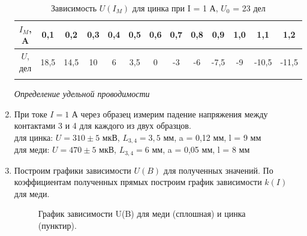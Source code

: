 \documentclass[a4paper, 12pt]{article}%
\begin{document}
\begin{enumerate}
	\begin{longtable} {|c|c|c|c|c|c|c|c|c|c|c|c|c|}
		\hline
		$I_M$, A & 0,1 & 0,2 & 0,3 & 0,4 & 0,5 & 0,6 & 0,7 & 0,8 & 0,9 & 1,0 & 1,1 & 1,2  \\ \hline
		$U$, дел & 18,5 & 14,5 & 10 & 6 & 3,5 & 0 & -3 & -6 & -7,5 & -9 & -10,5 & -11,5 \\ \hline
		\caption{Зависимость $U(I_M)$ для цинка при I = 1 А, $U_0$ = 23 дел}
	\end{longtable}
		
	
	\newpage
	\textit{Определение удельной проводимости}\\
	
	\item При токе $I = 1 $ А через образец измерим падение напряжения между контактами 3 и 4 для каждого из двух образцов.\\
	для цинка: $U = 310 \pm 5$ мкВ, $L_{3,4} = 3,5$ мм, a = 0,12 мм, l = 9 мм\\
	для меди: $U = 470 \pm 5$ мкВ, $L_{3,4} = 6$ мм, a = 0,05 мм, l = 8 мм\\
	
	\item Построим графики зависимости $U(B)$ для полученных значений. По коэффициентам полученных прямых построим график зависимости $k(I)$ для меди.
	
	
	\begin{figure}[H]
		\caption{График зависимости U(B) для меди (сплошная) и цинка (пунктир).}
	\end{figure}


\end{enumerate}
\end{document}
